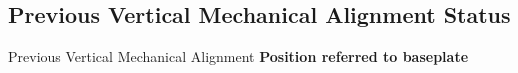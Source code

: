 \documentclass[a4paper,11pt]{book}
\begin{document}
\subsection{Previous Vertical Mechanical Alignment Status}
Previous Vertical Mechanical Alignment
\centering\vspace*{0cm}
\textbf{Position referred to {\color{blue} baseplate}}\\
\raggedright
\begin{minipage}{0.5\textwidth}
\end{minipage}\hfill\hspace*{-2cm}\vspace*{2cm}
\end{document}
